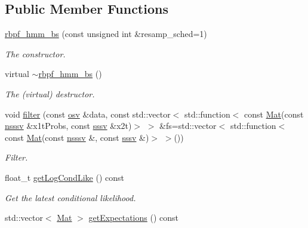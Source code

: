 \subsection*{Public Member Functions}
\begin{DoxyCompactItemize}
\item 
\hyperlink{classrbpf__hmm__bs_ac01f1c423a77af0aaecbddfcaa771f36}{rbpf\+\_\+hmm\+\_\+bs} (const unsigned int \&resamp\+\_\+sched=1)
\begin{DoxyCompactList}\small\item\em The constructor. \end{DoxyCompactList}\item 
\mbox{\label{classrbpf__hmm__bs_a55eb83a01df3adeb6d2fcb8999dc843b}} 
virtual \hyperlink{classrbpf__hmm__bs_a55eb83a01df3adeb6d2fcb8999dc843b}{$\sim$rbpf\+\_\+hmm\+\_\+bs} ()
\begin{DoxyCompactList}\small\item\em The (virtual) destructor. \end{DoxyCompactList}\item 
void \hyperlink{classrbpf__hmm__bs_aebadcd5b921f3523d32f7b3cce75f5ba}{filter} (const \hyperlink{classrbpf__hmm__bs_a6ec23f9c6eff96f8967c3c451c32b772}{osv} \&data, const std\+::vector$<$ std\+::function$<$ const \hyperlink{classrbpf__hmm__bs_aa0bd79c7ece59908ed08c51da3d67dad}{Mat}(const \hyperlink{classrbpf__hmm__bs_a98c86f40e4ca55ff16156077b11032ca}{nsssv} \&x1t\+Probs, const \hyperlink{classrbpf__hmm__bs_a9a1c8d64f693a34a902dbfcb009d0f96}{sssv} \&x2t)$>$ $>$ \&fs=std\+::vector$<$ std\+::function$<$ const \hyperlink{classrbpf__hmm__bs_aa0bd79c7ece59908ed08c51da3d67dad}{Mat}(const \hyperlink{classrbpf__hmm__bs_a98c86f40e4ca55ff16156077b11032ca}{nsssv} \&, const \hyperlink{classrbpf__hmm__bs_a9a1c8d64f693a34a902dbfcb009d0f96}{sssv} \&)$>$ $>$())
\begin{DoxyCompactList}\small\item\em Filter. \end{DoxyCompactList}\item 
float\+\_\+t \hyperlink{classrbpf__hmm__bs_a937c6d7cb57f097d0ba981a14cb40976}{get\+Log\+Cond\+Like} () const
\begin{DoxyCompactList}\small\item\em Get the latest conditional likelihood. \end{DoxyCompactList}\item 
std\+::vector$<$ \hyperlink{classrbpf__hmm__bs_aa0bd79c7ece59908ed08c51da3d67dad}{Mat} $>$ \hyperlink{classrbpf__hmm__bs_a1953395fb287449ba78cb5c324037ee5}{get\+Expectations} () const

\end{DoxyCompactItemize}
